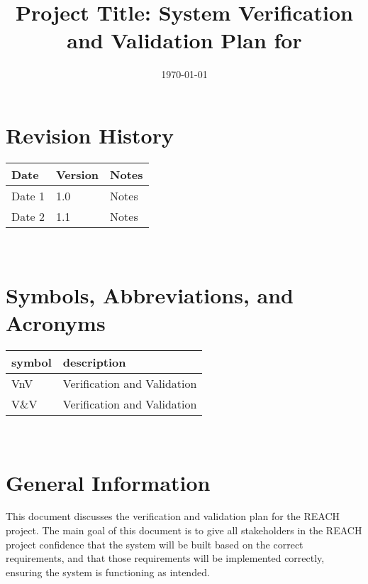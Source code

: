 \documentclass[12pt, titlepage]{article}
\begin{document}
\title{Project Title: System Verification and Validation Plan for \progname{}} 
\author{\authname}
\date{\today}
	
\maketitle


\section*{Revision History}

\begin{tabularx}{\textwidth}{p{3cm}p{2cm}X}
\toprule {\bf Date} & {\bf Version} & {\bf Notes}\\
\midrule
Date 1 & 1.0 & Notes\\
Date 2 & 1.1 & Notes\\
\bottomrule
\end{tabularx}

~\\

\newpage

\tableofcontents

\listoftables

\newpage

\section{Symbols, Abbreviations, and Acronyms}

\renewcommand{\arraystretch}{1.2}
\begin{tabular}{l l} 
  \toprule		
  \textbf{symbol} & \textbf{description}\\
  \midrule 
  VnV & Verification and Validation\\
  V\&V & Verification and Validation\\
  \bottomrule
\end{tabular}\\

\newpage


\section{General Information}

This document discusses the verification and validation plan for the REACH project. The main goal of this document
is to give all stakeholders in the REACH project confidence that the system will be built based on the correct 
requirements, and that those requirements will be implemented correctly, ensuring the system is functioning as intended.
\end{document}
